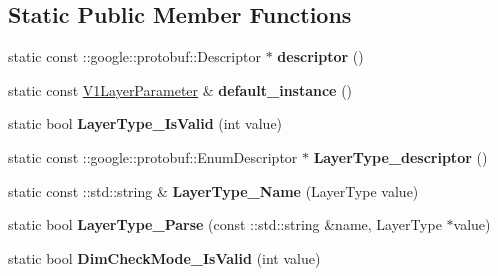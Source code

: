 \subsection*{Static Public Member Functions}
\begin{DoxyCompactItemize}
\item 
\mbox{\label{classcaffe_1_1_v1_layer_parameter_a54bb412f9a592ebf297dc705a4cb17ed}} 
static const \+::google\+::protobuf\+::\+Descriptor $\ast$ {\bfseries descriptor} ()
\item 
\mbox{\label{classcaffe_1_1_v1_layer_parameter_a0804dca6cf811e7fdeebd9083ca65920}} 
static const \mbox{\hyperlink{classcaffe_1_1_v1_layer_parameter}{V1\+Layer\+Parameter}} \& {\bfseries default\+\_\+instance} ()
\item 
\mbox{\label{classcaffe_1_1_v1_layer_parameter_a329f9f5cbb65a20c0691c0bdb3e8b20b}} 
static bool {\bfseries Layer\+Type\+\_\+\+Is\+Valid} (int value)
\item 
\mbox{\label{classcaffe_1_1_v1_layer_parameter_a39a0cb8e50c3458731da531508a6e24e}} 
static const \+::google\+::protobuf\+::\+Enum\+Descriptor $\ast$ {\bfseries Layer\+Type\+\_\+descriptor} ()
\item 
\mbox{\label{classcaffe_1_1_v1_layer_parameter_a06aea9acb8f1825d4a83b6bc930246d6}} 
static const \+::std\+::string \& {\bfseries Layer\+Type\+\_\+\+Name} (Layer\+Type value)
\item 
\mbox{\label{classcaffe_1_1_v1_layer_parameter_a4c26e27af24bb6fae49cedb85800effe}} 
static bool {\bfseries Layer\+Type\+\_\+\+Parse} (const \+::std\+::string \&name, Layer\+Type $\ast$value)
\item 
\mbox{\label{classcaffe_1_1_v1_layer_parameter_a5e1e0fd77a900307debbff4701297002}} 
static bool {\bfseries Dim\+Check\+Mode\+\_\+\+Is\+Valid} (int value)
\item 
\mbox{\label{classcaffe_1_1_v1_layer_parameter_a2aaf4ecfa539ff5724bc7c473561f137}} 

\end{DoxyCompactItemize}
